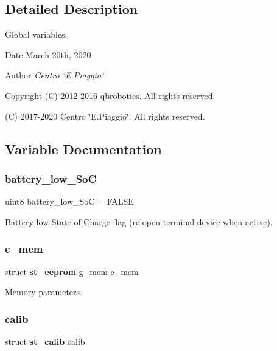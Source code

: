\subsection{Detailed Description}
Global variables. 

\begin{DoxyDate}{Date}
March 20th, 2020 
\end{DoxyDate}
\begin{DoxyAuthor}{Author}
{\itshape Centro \char`\"{}\+E.\+Piaggio\char`\"{}} 
\end{DoxyAuthor}
\begin{DoxyCopyright}{Copyright}
(C) 2012-\/2016 qbrobotics. All rights reserved. 

(C) 2017-\/2020 Centro \char`\"{}\+E.\+Piaggio\char`\"{}. All rights reserved. 
\end{DoxyCopyright}


\subsection{Variable Documentation}
\mbox{\label{globals_8c_ab4765549a3f6990d35f3d0740263b254}} 
\subsubsection{battery\+\_\+low\+\_\+\+SoC}
{\footnotesize\ttfamily uint8 battery\+\_\+low\+\_\+\+SoC = F\+A\+L\+SE}

Battery low State of Charge flag (re-\/open terminal device when active). \mbox{\label{globals_8c_a3ad3057028e3ab399e1d1549a8d67ab9}} 
\subsubsection{c\+\_\+mem}
{\footnotesize\ttfamily struct \textbf{ st\+\_\+eeprom} g\+\_\+mem c\+\_\+mem}

Memory parameters. \mbox{\label{globals_8c_aed96fdd8308fe2c4fc07c3b5db1c7bbb}} 
\subsubsection{calib}
{\footnotesize\ttfamily struct \textbf{ st\+\_\+calib} calib}

